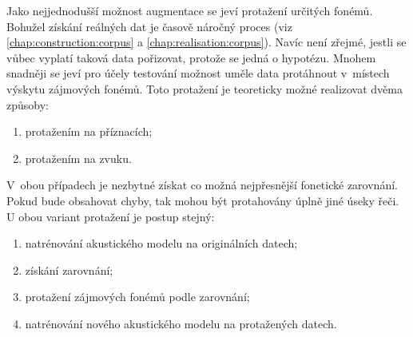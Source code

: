 
Jako nejjednodušší možnost augmentace se jeví protažení určitých fonémů.
Bohužel získání reálných dat je časově náročný proces (viz \ref{chap:construction:corpus} a \ref{chap:realisation:corpus}).
Navíc není zřejmé, jestli se vůbec vyplatí taková data pořizovat, protože se jedná o hypotézu.
Mnohem snadněji se jeví pro účely testování možnost uměle data protáhnout v~místech výskytu zájmových fonémů.
Toto protažení je teoreticky možné realizovat dvěma způsoby:

\begin{enumerate}
  \item protažením na příznacích;
  \item protažením na zvuku.
\end{enumerate}

\noindent V~obou případech je nezbytné získat co možná nejpřesnější fonetické zarovnání. Pokud bude obsahovat chyby, tak mohou být protahovány úplně jiné úseky řeči.
U obou variant protažení je postup stejný:

\begin{enumerate}
  \item natrénování akustického modelu na originálních datech;
  \item získání zarovnání;
  \item protažení zájmových fonémů podle zarovnání;
  \item natrénování nového akustického modelu na protažených datech.
\end{enumerate}

